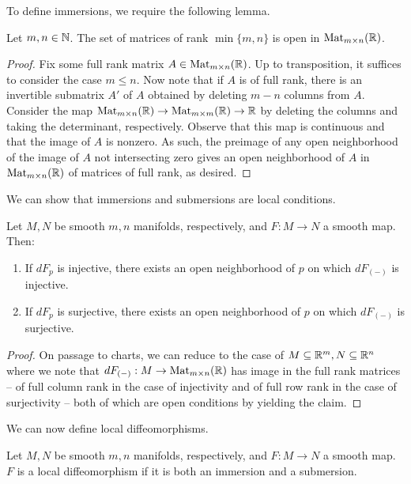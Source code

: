 To define immersions, we require the following lemma. 
\begin{lemma}\label{lem: subset of matrices of full rank is open}
    Let $m,n\in\mathbb{N}$. The set of matrices of rank $\min\{m,n\}$ is open in $\mathrm{Mat}_{m\times n}(\mathbb{R})$. 
\end{lemma}
\begin{proof}
    Fix some full rank matrix $A\in\mathrm{Mat}_{m\times n}(\mathbb{R})$. Up to transposition, it suffices to consider the case $m\leq n$. Now note that if $A$ is of full rank, there is an invertible submatrix $A'$ of $A$ obtained by deleting $m-n$ columns from $A$. Consider the map $\mathrm{Mat}_{m\times n}(\mathbb{R})\to\mathrm{Mat}_{m\times m}(\mathbb{R})\to\mathbb{R}$ by deleting the columns and taking the determinant, respectively. Observe that this map is continuous and that the image of $A$ is nonzero. As such, the preimage of any open neighborhood of the image of $A$ not intersecting zero gives an open neighborhood of $A$ in $\mathrm{Mat}_{m\times n}(\mathbb{R})$ of matrices of full rank, as desired. 
\end{proof}
We can show that immersions and submersions are local conditions. 
\begin{proposition}\label{prop: immersions and submersions are local}
    Let $M,N$ be smooth $m,n$ manifolds, respectively, and $F:M\to N$ a smooth map. Then:
    \begin{enumerate}[label=(\roman*)]
        \item If $dF_{p}$ is injective, there exists an open neighborhood of $p$ on which $dF_{(-)}$ is injective. 
        \item If $dF_{p}$ is surjective, there exists an open neighborhood of $p$ on which $dF_{(-)}$ is surjective.
    \end{enumerate}
\end{proposition}
\begin{proof}
    On passage to charts, we can reduce to the case of $M\subseteq\mathbb{R}^{m},N\subseteq\mathbb{R}^{n}$ where we note that $dF_{(-)}:M\to\mathrm{Mat}_{m\times n}(\mathbb{R})$ has image in the full rank matrices -- of full column rank in the case of injectivity and of full row rank in the case of surjectivity -- both of which are open conditions by  yielding the claim. 
\end{proof}
We can now define local diffeomorphisms. 
\begin{definition}\label{def: local diffeomorphism}
    Let $M,N$ be smooth $m,n$ manifolds, respectively, and $F:M\to N$ a smooth map. $F$ is a local diffeomorphism if it is both an immersion and a submersion. 
\end{definition}

